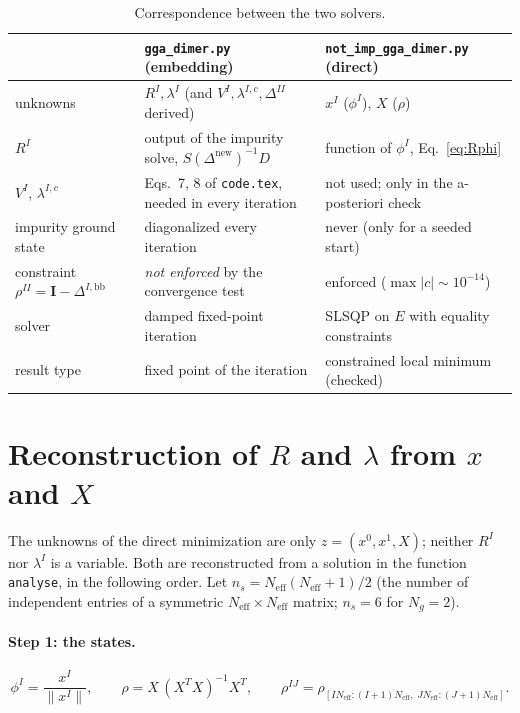 \documentclass[11pt]{article}
\newcommand{\Neff}{N_{\mathrm{eff}}}
\newcommand{\Ng}{N_{g}}
\newcommand{\Ybb}{\Delta^{I,\mathrm{bb}}}
\begin{document}
\begin{table}[H]
\centering
\small
\begin{tabular}{p{4.6cm}p{5.1cm}p{5.1cm}}
\toprule
 & \texttt{gga\_dimer.py} (embedding) & \texttt{not\_imp\_gga\_dimer.py} (direct) \\
\midrule
unknowns & $R^I,\lambda^I$ (and $V^I,\lambda^{I,c},\Delta^{II}$ derived) & $x^I$ ($\phi^I$), $X$ ($\rho$) \\
$R^I$ & output of the impurity solve, $S(\Delta^{\mathrm{new}})^{-1}D$ & function of $\phi^I$, Eq.~\eqref{eq:Rphi} \\
$V^I$, $\lambda^{I,c}$ & Eqs.~7, 8 of \texttt{code.tex}, needed in every iteration & not used; only in the a-posteriori check \\
impurity ground state & diagonalized every iteration & never (only for a seeded start) \\
constraint $\rho^{II}=\mathbf I-\Ybb$ & \emph{not enforced} by the convergence test & enforced ($\max|c|\sim10^{-14}$) \\
solver & damped fixed-point iteration & SLSQP on $E$ with equality constraints \\
result type & fixed point of the iteration & constrained local minimum (checked) \\
\bottomrule
\end{tabular}
\caption{Correspondence between the two solvers.}
\end{table}

\section{Reconstruction of $R$ and $\lambda$ from $x$ and $X$}
\label{sec:reconstruction}

The unknowns of the direct minimization are only $z=(x^0,x^1,X)$; neither $R^I$ nor
$\lambda^I$ is a variable. Both are reconstructed from a solution in the function
\texttt{analyse}, in the following order. Let $n_s=\Neff(\Neff+1)/2$ (the number of independent
entries of a symmetric $\Neff\times\Neff$ matrix; $n_s=6$ for $\Ng=2$).

\paragraph{Step 1: the states.}
\begin{equation}
  \phi^{I}=\frac{x^{I}}{\lVert x^{I}\rVert},\qquad
  \rho=X\,(X^{T}X)^{-1}X^{T},\qquad
  \rho^{IJ}=\rho_{[I\Neff:(I+1)\Neff,\;J\Neff:(J+1)\Neff]} .
\end{equation}
\end{document}
